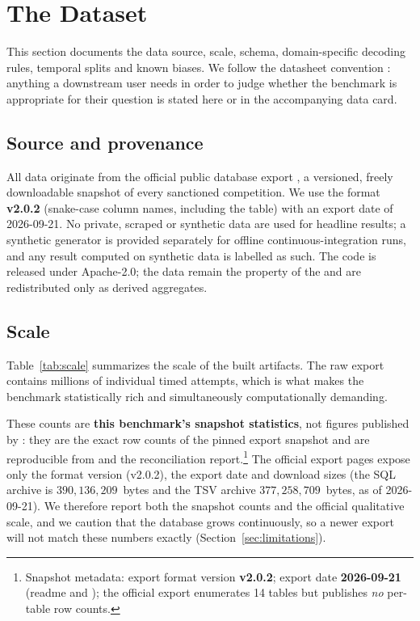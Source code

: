 \section{The \wcabench{} Dataset}
\label{sec:dataset}

This section documents the data source, scale, schema, domain-specific
decoding rules, temporal splits and known biases. We follow the datasheet
convention \citep{datasheets}: anything a downstream user needs in order to
judge whether the benchmark is appropriate for their question is stated here
or in the accompanying data card.

\subsection{Source and provenance}
\label{sec:data-source}

All data originate from the official \wca{} public database export
\citep{wca_export}, a versioned, freely downloadable snapshot of every
sanctioned competition. We use the  format
\textbf{v2.0.2} (snake-case column names, including the 
table) with an export date of 2026-09-21. No private, scraped or synthetic data
are used for headline results; a synthetic generator is provided separately for
offline continuous-integration runs, and any result computed on synthetic data
is labelled as such. The code is released under Apache-2.0; the data remain
the property of the \wca{} and are redistributed only as derived aggregates.

\subsection{Scale}
\label{sec:data-scale}

Table~\ref{tab:scale} summarizes the scale of the built artifacts. The raw
export contains millions of individual timed attempts, which is what makes the
benchmark statistically rich and simultaneously computationally demanding.

These counts are \textbf{this benchmark's snapshot statistics}, not figures
published by \wca{}: they are the exact row counts of the pinned export
snapshot and are reproducible from  and the
reconciliation report.\footnote{Snapshot metadata: export format version
\textbf{v2.0.2}; export date \textbf{2026-09-21} (readme and
); the official export enumerates 14 tables but publishes
\emph{no} per-table row counts.} The official \wca{} export pages expose only
the format version (v2.0.2), the export date and download sizes (the SQL
archive is $390{,}136{,}209$~bytes and the TSV archive $377{,}258{,}709$~bytes,
as of 2026-09-21). We therefore report both the snapshot counts and the
official qualitative scale, and we caution that the \wca{} database grows
continuously, so a newer export will not match these numbers exactly
(Section~\ref{sec:limitations}).

